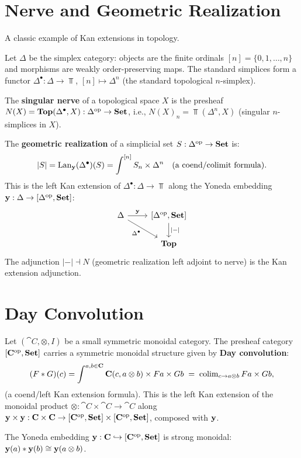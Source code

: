 \section{Nerve and Geometric Realization}

A classic example of Kan extensions in topology.

\begin{example}
Let $\Delta$ be the simplex category: objects are the finite ordinals $[n] = \{0,1,\ldots,n\}$ and morphisms are weakly order-preserving maps. The standard simplices form a functor $\Delta^\bullet: \Delta \to \Top$, $[n] \mapsto \Delta^n$ (the standard topological $n$-simplex).

The \textbf{singular nerve} of a topological space $X$ is the presheaf $N(X) = \mathbf{Top}(\Delta^\bullet, X): \Delta^{\mathrm{op}} \to \mathbf{Set}$, i.e., $N(X)_n = \Top(\Delta^n, X)$ (singular $n$-simplices in $X$).

The \textbf{geometric realization} of a simplicial set $S: \Delta^{\mathrm{op}} \to \mathbf{Set}$ is:
\[
  |S| = \operatorname{Lan}_{\mathbf{y}} (\Delta^\bullet)(S) = \int^{[n]} S_n \times \Delta^n \quad (\text{a coend/colimit formula}).
\]
This is the left Kan extension of $\Delta^\bullet: \Delta \to \Top$ along the Yoneda embedding $\mathbf{y}: \Delta \to [\Delta^{\mathrm{op}}, \mathbf{Set}]$:
\[
  \begin{tikzcd}
    \Delta \arrow[r, "\yo"] \arrow[dr, "\Delta^\bullet"'] & {[\Delta\op, \Set]} \arrow[d, "|-|"] \\
    & \Top
  \end{tikzcd}
\]
The adjunction $|-| \dashv N$ (geometric realization left adjoint to nerve) is the Kan extension adjunction.
\end{example}

\section{Day Convolution}

\begin{theorem}
Let $(\cat{C}, \otimes, I)$ be a small symmetric monoidal category. The presheaf category $[\mathbf{C}^{\mathrm{op}}, \mathbf{Set}]$ carries a symmetric monoidal structure given by \textbf{Day convolution}:
\[
  (F * G)(c) = \int^{a,b \in \mathbf{C}} \mathbf{C}(c, a \otimes b) \times Fa \times Gb \;=\; \operatorname{colim}_{c \to a \otimes b} Fa \times Gb,
\]
(a coend/left Kan extension formula). This is the left Kan extension of the monoidal product $\otimes: \cat{C} \times \cat{C} \to \cat{C}$ along $\mathbf{y} \times \mathbf{y}: \mathbf{C} \times \mathbf{C} \to [\mathbf{C}^{\mathrm{op}},\mathbf{Set}] \times [\mathbf{C}^{\mathrm{op}},\mathbf{Set}]$, composed with $\mathbf{y}$.

The Yoneda embedding $\mathbf{y}: \mathbf{C} \hookrightarrow [\mathbf{C}^{\mathrm{op}},\mathbf{Set}]$ is strong monoidal: $\mathbf{y}(a) * \mathbf{y}(b) \cong \mathbf{y}(a \otimes b)$.
\end{theorem}

